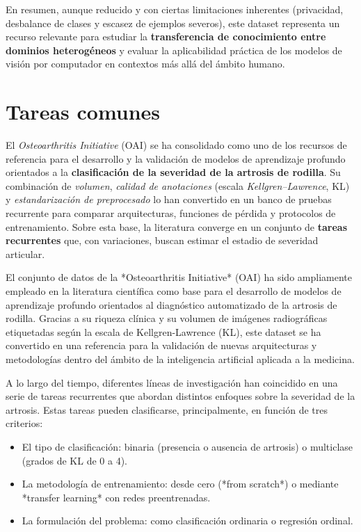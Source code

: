 \documentclass[11pt,spanish,listoffigures,listoftables]{tfgetsinf}
\begin{document}
En resumen, aunque reducido y con ciertas limitaciones inherentes (privacidad, desbalance de clases y escasez de ejemplos severos), este dataset representa un recurso relevante para estudiar la \textbf{transferencia de conocimiento entre dominios heterogéneos} y evaluar la aplicabilidad práctica de los modelos de visión por computador en contextos más allá del ámbito humano.

\section{Tareas comunes}
\label{sec:3_4_tareas_comunes}

El \emph{Osteoarthritis Initiative} (OAI) se ha consolidado como uno de los recursos de referencia para el desarrollo y la validación de modelos de aprendizaje profundo orientados a la \textbf{clasificación de la severidad de la artrosis de rodilla}. Su combinación de \emph{volumen}, \emph{calidad de anotaciones} (escala \textit{Kellgren--Lawrence}, KL) y \emph{estandarización de preprocesado} lo han convertido en un banco de pruebas recurrente para comparar arquitecturas, funciones de pérdida y protocolos de entrenamiento. Sobre esta base, la literatura converge en un conjunto de \textbf{tareas recurrentes} que, con variaciones, buscan estimar el estadio de severidad articular.


El conjunto de datos de la *Osteoarthritis Initiative* (OAI) ha sido ampliamente empleado en la literatura científica como base para el desarrollo de modelos de aprendizaje
profundo orientados al diagnóstico automatizado de la artrosis de rodilla. Gracias a su riqueza clínica y su volumen de imágenes radiográficas etiquetadas según la escala de
Kellgren-Lawrence (KL), este dataset se ha convertido en una referencia para la validación de nuevas arquitecturas y metodologías dentro del ámbito de la inteligencia 
artificial aplicada a la medicina.

A lo largo del tiempo, diferentes líneas de investigación han coincidido en una serie de tareas recurrentes que abordan distintos enfoques sobre la severidad de la artrosis. 
Estas tareas pueden clasificarse, principalmente, en función de tres criterios:

\begin{itemize}
    \item El tipo de clasificación: binaria (presencia o ausencia de artrosis) o multiclase (grados de KL de 0 a 4).
    \item La metodología de entrenamiento: desde cero (*from scratch*) o mediante *transfer learning* con redes preentrenadas.
    \item La formulación del problema: como clasificación ordinaria o regresión ordinal.
\end{itemize}
\end{document}
